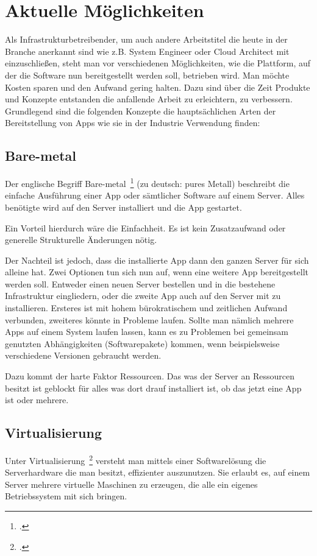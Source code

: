 \newpage
\section{Aktuelle Möglichkeiten}
Als Infrastrukturbetreibender, um auch andere Arbeitstitel die heute in der Branche anerkannt sind wie z.B. System Engineer oder Cloud Architect mit einzuschließen, 
steht man vor verschiedenen Möglichkeiten, wie die Plattform, auf der die Software nun bereitgestellt werden soll, betrieben wird. Man möchte Kosten sparen und den Aufwand gering halten.
Dazu sind über die Zeit Produkte und Konzepte entstanden die anfallende Arbeit zu erleichtern, zu verbessern.
Grundlegend sind die folgenden Konzepte die hauptsächlichen Arten der Bereitstellung von Apps wie sie in der Industrie Verwendung finden:

\subsection{Bare-metal}
Der englische Begriff Bare-metal~\footcite[Vgl. ][]{website:baremetal} (zu deutsch: pures Metall) beschreibt die einfache Ausführung einer App oder sämtlicher Software auf einem Server. 
Alles benötigte wird auf den Server installiert und die App gestartet.

Ein Vorteil hierdurch wäre die Einfachheit. Es ist kein Zusatzaufwand oder generelle Strukturelle Änderungen nötig.

Der Nachteil ist jedoch, dass die installierte App dann den ganzen Server für sich alleine hat. Zwei Optionen tun sich nun auf, wenn eine weitere App bereitgestellt werden soll. 
Entweder einen neuen Server bestellen und in die bestehene Infrastruktur eingliedern, oder die zweite App auch auf den Server mit zu installieren.
Ersteres ist mit hohem bürokratischem und zeitlichen Aufwand verbunden, zweiteres könnte in Probleme laufen. 
Sollte man nämlich mehrere Apps auf einem System laufen lassen, kann es zu Problemen bei gemeinsam genutzten Abhängigkeiten (Softwarepakete) kommen, wenn beispielsweise verschiedene Versionen gebraucht werden.

Dazu kommt der harte Faktor Ressourcen. Das was der Server an Ressourcen besitzt ist geblockt für alles was dort drauf installiert ist, ob das jetzt eine App ist oder mehrere.

\subsection{Virtualisierung}
Unter Virtualisierung~\footcite[Vgl. ][]{website:virtdock} versteht man mittels einer Softwarelösung die Serverhardware die man besitzt, effizienter auszunutzen.
Sie erlaubt es, auf einem Server mehrere virtuelle Maschinen zu erzeugen, die alle ein eigenes Betriebssystem mit sich bringen.

